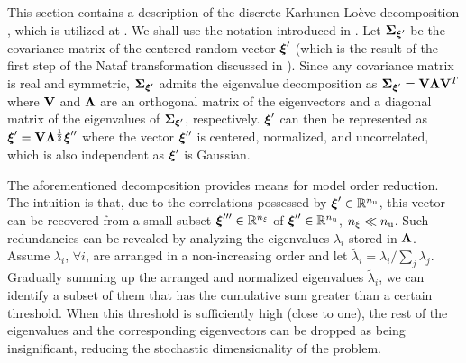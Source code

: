 This section contains a description of the discrete Karhunen-Lo\`{e}ve decomposition \cite{ghanem1991}, which is utilized at .
We shall use the notation introduced in .
Let $\mCov_{\vZ'}$ be the covariance matrix of the centered random vector $\boldsymbol{\xi}'$ (which is the result of the first step of the Nataf transformation discussed in ).
Since any covariance matrix is real and symmetric, $\mCov_{\vZ'}$ admits the eigenvalue decomposition as $\mCov_{\vZ'} = \m{V} \m{\Lambda} \m{V}^T$ where $\m{V}$ and $\m{\Lambda}$ are an orthogonal matrix of the eigenvectors and a diagonal matrix of the eigenvalues of $\mCov_{\vZ'}$, respectively.
$\boldsymbol{\xi}'$ can then be represented as $\vZ' = \m{V} \m{\Lambda}^\frac{1}{2} \vZ''$ where the vector $\boldsymbol{\xi}''$ is centered, normalized, and uncorrelated, which is also independent as $\boldsymbol{\xi}'$ is Gaussian.

The aforementioned decomposition provides means for model order reduction.
The intuition is that, due to the correlations possessed by $\boldsymbol{\xi}' \in \mathbb{R}^{n_\text{u}}$, this vector can be recovered from a small subset $\boldsymbol{\xi}''' \in \mathbb{R}^{n_\xi}$ of $\boldsymbol{\xi}'' \in \mathbb{R}^{n_\text{u}}$, ${n_\xi} \ll {n_\text{u}}$.
Such redundancies can be revealed by analyzing the eigenvalues $\lambda_i$ stored in $\m{\Lambda}$.
Assume $\lambda_i$, $\forall i$, are arranged in a non-increasing order and let $\tilde{\lambda}_i = \lambda_i / \sum_j \lambda_j$.
Gradually summing up the arranged and normalized eigenvalues $\tilde{\lambda}_i$, we can identify a subset of them that has the cumulative sum greater than a certain threshold.
When this threshold is sufficiently high (close to one), the rest of the eigenvalues and the corresponding eigenvectors can be dropped as being insignificant, reducing the stochastic dimensionality of the problem.
